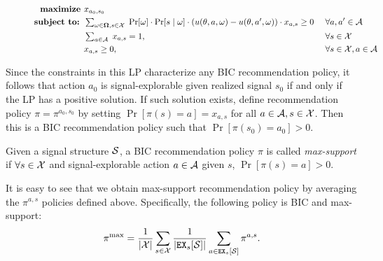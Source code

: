 \begin{figure}[H]
\begin{mdframed}
\vspace{-5mm}
\begin{alignat*}{2}
\textbf{maximize }   & x_{a_0,s_0}\  \\
\textbf{subject to: }
    & \textstyle \sum_{\omega \in \varOmega, s \in \X} \;
    \Pr[\omega] \cdot \Pr[s \mid  \omega] \cdot
        \left(u(\theta, a, \omega) - u(\theta, a', \omega)\right) \cdot x_{a,s} \geq 0   &\ & \forall a,a' \in \A \\
    & \textstyle \sum_{a\in \A}\; x_{a,s} = 1,  \ &\ & \forall s \in \X \\
    & x_{a,s} \geq 0,  \ &\ & \forall s \in \X, a\in \A
\end{alignat*}
\end{mdframed}
\label{fig:public_lp}
\end{figure}

Since the constraints in this LP characterize any BIC recommendation policy, it follows that action $a_0$ is signal-explorable given realized signal $s_0$ if and only if the LP has a positive solution. If such solution exists, define recommendation policy $\pi = \pi^{a_0,s_0}$ by setting
    $\Pr[\pi(s) = a] = x_{a,s}$ for all $a\in \A, s\in \X$.
Then this is a BIC recommendation policy such that
    $\Pr[\pi(s_0) = a_0] > 0$.

\begin{definition}
Given a signal structure $\S$, a BIC recommendation policy $\pi$ is called  \emph{max-support} if $\forall s \in \X$  and signal-explorable action $a\in \A$ given $s$, $\Pr[\pi(s) = a] > 0$.
\end{definition}


It is easy to see that we obtain max-support recommendation policy by averaging the $\pi^{a,s}$ policies defined above. Specifically, the following policy is BIC and max-support:
\begin{align}\label{eq:pimax}
\pi^{\max} = \frac{1}{|\X|} \sum_{s \in \X} \frac{1}{|\EX_s[\S]|} \sum_{a \in \EX_s[\S]} \pi^{a,s}.
\end{align}

%

